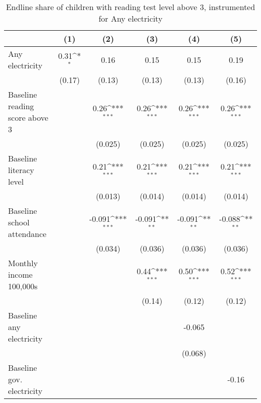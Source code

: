 \begin{table}[htbp]\centering
\def\sym#1{\ifmmode^{#1}\else\(^{#1}\)\fi}
\caption{Endline share of children with reading test level above 3, instrumented for Any electricity}
\begin{tabular*}{1\hsize}{@{\hskip\tabcolsep\extracolsep\fill}l*{5}{c}}
\toprule
                &\multicolumn{1}{c}{(1)}         &\multicolumn{1}{c}{(2)}         &\multicolumn{1}{c}{(3)}         &\multicolumn{1}{c}{(4)}         &\multicolumn{1}{c}{(5)}         \\
\midrule
Any electricity &     0.31\sym{*}  &     0.16         &     0.15         &     0.15         &     0.19         \\
                &   (0.17)         &   (0.13)         &   (0.13)         &   (0.13)         &   (0.16)         \\
Baseline reading score above 3&                  &     0.26\sym{***}&     0.26\sym{***}&     0.26\sym{***}&     0.26\sym{***}\\
                &                  &  (0.025)         &  (0.025)         &  (0.025)         &  (0.025)         \\
Baseline literacy level&                  &     0.21\sym{***}&     0.21\sym{***}&     0.21\sym{***}&     0.21\sym{***}\\
                &                  &  (0.013)         &  (0.014)         &  (0.014)         &  (0.014)         \\
Baseline school attendance&                  &   -0.091\sym{***}&   -0.091\sym{**} &   -0.091\sym{**} &   -0.088\sym{**} \\
                &                  &  (0.034)         &  (0.036)         &  (0.036)         &  (0.036)         \\
Monthly income 100,000s&                  &                  &     0.44\sym{***}&     0.50\sym{***}&     0.52\sym{***}\\
                &                  &                  &   (0.14)         &   (0.12)         &   (0.12)         \\
Baseline any electricity&                  &                  &                  &   -0.065         &                  \\
                &                  &                  &                  &  (0.068)         &                  \\
Baseline gov. electricity&                  &                  &                  &                  &    -0.16         \\

\end{tabular*}
\end{table}
